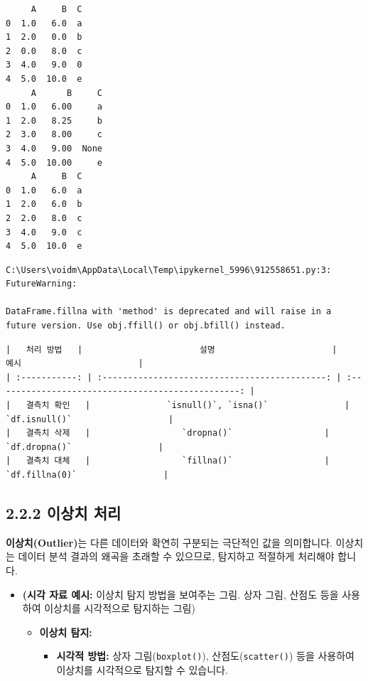 \documentclass[
  letterpaper,
]{book}
\providecommand{\tightlist}{%
  \setlength{\itemsep}{0pt}\setlength{\parskip}{0pt}}
\begin{document}
\begin{verbatim}
     A     B  C
0  1.0   6.0  a
1  2.0   0.0  b
2  0.0   8.0  c
3  4.0   9.0  0
4  5.0  10.0  e
     A      B     C
0  1.0   6.00     a
1  2.0   8.25     b
2  3.0   8.00     c
3  4.0   9.00  None
4  5.0  10.00     e
     A     B  C
0  1.0   6.0  a
1  2.0   6.0  b
2  2.0   8.0  c
3  4.0   9.0  c
4  5.0  10.0  e
\end{verbatim}

\begin{verbatim}
C:\Users\voidm\AppData\Local\Temp\ipykernel_5996\912558651.py:3: FutureWarning:

DataFrame.fillna with 'method' is deprecated and will raise in a future version. Use obj.ffill() or obj.bfill() instead.
\end{verbatim}

\begin{verbatim}
|   처리 방법   |                       설명                       |                       예시                       |
| :-----------: | :--------------------------------------------: | :------------------------------------------------: |
|   결측치 확인   |               `isnull()`, `isna()`               |                   `df.isnull()`                   |
|   결측치 삭제   |                  `dropna()`                  |                 `df.dropna()`                 |
|   결측치 대체   |                  `fillna()`                  |                 `df.fillna(0)`                 |
\end{verbatim}

\subsection{2.2.2 이상치 처리}\label{uxc774uxc0c1uxce58-uxcc98uxb9ac}

\textbf{이상치(Outlier)}는 다른 데이터와 확연히 구분되는 극단적인 값을
의미합니다. 이상치는 데이터 분석 결과의 왜곡을 초래할 수 있으므로,
탐지하고 적절하게 처리해야 합니다.

\begin{itemize}
\item
  \textbf{(시각 자료 예시:} 이상치 탐지 방법을 보여주는 그림. 상자 그림,
  산점도 등을 사용하여 이상치를 시각적으로 탐지하는 그림)

  \begin{itemize}
  \tightlist
  \item
    \textbf{이상치 탐지:}

    \begin{itemize}
    \tightlist
    \item
      \textbf{시각적 방법:} 상자 그림(\texttt{boxplot()}),
      산점도(\texttt{scatter()}) 등을 사용하여 이상치를 시각적으로
      탐지할 수 있습니다.
    \end{itemize}
  \end{itemize}
\end{itemize}
\end{document}
